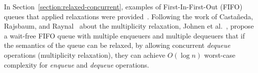 In Section~\ref{section:relaxed-concurrent}, examples of First-In-First-Out (FIFO) queues that applied relaxations were provided~\cite{DBLP_conf_cf_HaasLHPSKS13, DBLP_conf_pact_KirschLP13, DBLP_conf_ica3pp_KirschPRS12}. Following the work of Castañeda, Rajsbaum, and Raynal~\cite{DBLP_conf_opodis_CastanedaRR20} about the multiplicity relaxation, Johnen et al.~\cite{DBLP_conf_opodis_JohnenKM22}, propose a wait-free FIFO queue with multiple enqueuers and multiple dequeuers that if the semantics of the queue can be relaxed, by allowing concurrent \emph{dequeue} operations (multiplicity relaxation), they can achieve \(O(\log{n})\) worst-case complexity for \emph{enqueue} and \emph{dequeue} operations.


